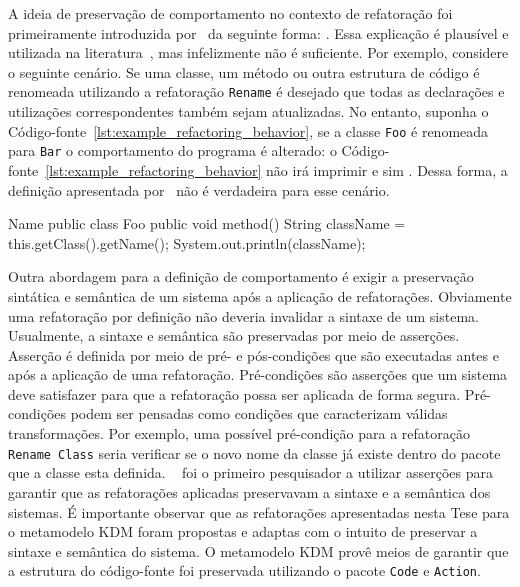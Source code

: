 A ideia de preservação de comportamento no contexto de refatoração foi primeiramente introduzida por~ da seguinte forma: . Essa explicação é plausível e utilizada na literatura~\cite{Roberts_1999, Fowler1999}, mas infelizmente não é suficiente. Por exemplo, considere o seguinte cenário. Se uma classe, um método ou outra estrutura de código é renomeada utilizando a refatoração \texttt{Rename} é desejado que todas as  declarações e utilizações correspondentes também sejam atualizadas. No entanto, suponha o Código-fonte~\ref{lst:example_refactoring_behavior}, se a classe \texttt{Foo} é renomeada para \texttt{Bar} o comportamento do programa é alterado: o Código-fonte~\ref{lst:example_refactoring_behavior} não irá imprimir  e sim . Dessa forma, a definição apresentada por~ não é verdadeira para esse cenário.   

\begin{codigo}[caption={[Um simples programa ilustrando porque é errado acreditar que refatoração não muda a saída de um programa.] Simples exemplo do efeito de uma refatoração.},escapeinside={(*@}{@*)}, basicstyle=\footnotesize, language=java, label={lst:example_refactoring_behavior}]{Name}
	public class Foo {
	    public void method(){
	        String className = this.getClass().getName();
	        System.out.println(className);
	    }
	}
\end{codigo}

Outra abordagem para a definição de comportamento é exigir a preservação sintática e semântica de um sistema após a aplicação de refatorações. Obviamente uma refatoração por definição não deveria invalidar a sintaxe de um sistema. Usualmente, a sintaxe e semântica são preservadas por meio de asserções. Asserção é definida por meio de pré- e pós-condições que são executadas antes e após a aplicação de uma refatoração. Pré-condições são asserções que um sistema deve satisfazer para que a refatoração possa ser aplicada de forma segura. Pré-condições podem ser pensadas como condições que caracterizam válidas transformações. Por exemplo, uma possível pré-condição para a refatoração \texttt{Rename Class} seria verificar se o novo nome da classe já existe dentro do pacote que a classe esta definida. ~ foi o primeiro pesquisador a utilizar asserções para garantir que as refatorações aplicadas preservavam a sintaxe e a semântica dos sistemas. É importante observar que as  refatorações apresentadas nesta Tese para o metamodelo KDM foram propostas e adaptas com o intuito de preservar a sintaxe e semântica do sistema. O metamodelo KDM provê meios de garantir que a estrutura do código-fonte foi preservada utilizando o pacote \texttt{Code} e \texttt{Action}.

